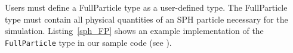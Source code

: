 Users must define a \textsf{FullParticle} type as a user-defined type. The \textsf{FullParticle} type must contain all physical quantities of an SPH particle necessary for the simulation. Listing~\ref{sph_FP} shows an example implementation of the \texttt{FullParticle} type in our sample code (see ).

\ifCpp %

\endifCpp
\ifFtn %

\endifFtn
\ifC %

\endifC

